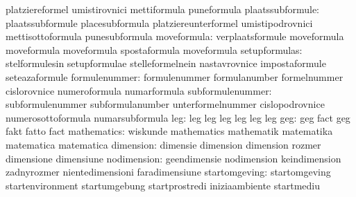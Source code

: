                                  platziereformel                  umistirovnici
                                  mettiformula                     puneformula
                plaatssubformule: plaatssubformule                 placesubformula
                                  platziereunterformel             umistipodrovnici
                                  mettisottoformula                punesubformula
moveformula: verplaatsformule  moveformula
             moveformula       moveformula
             spostaformula       moveformula
                   setupformulas: stelformulesin                   setupformulae
                                  stelleformelnein                 nastavrovnice
                                  impostaformule                   seteazaformule
                   formulenummer: formulenummer                    formulanumber
                                  formelnummer                     cislorovnice
                                  numeroformula                    numarformula
                subformulenummer: subformulenummer                 subformulanumber
                                  unterformelnummer                cislopodrovnice
                                  numerosottoformula               numarsubformula
                             leg: leg                              leg
                                  leg                              leg
                                  leg                              leg
                             geg: geg                              fact
                                  geg                              fakt
                                  fatto                            fact
                     mathematics: wiskunde                         mathematics
                                  mathematik                       matematika
                                  matematica                       matematica
                       dimension: dimensie                         dimension
                                  dimension                        rozmer
                                  dimensione                       dimensiune
                     nodimension: geendimensie                     nodimension
                                  keindimension                    zadnyrozmer
                                  nientedimensioni                 faradimensiune
                   startomgeving: startomgeving                    startenvironment
                                  startumgebung                    startprostredi
                                  iniziaambiente                   startmediu

